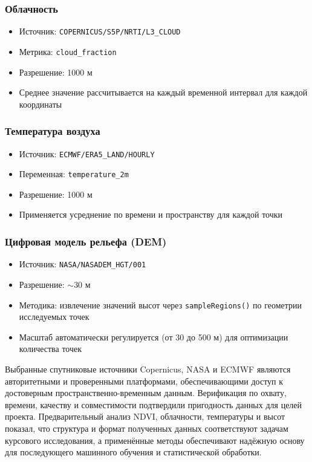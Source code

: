 \subsubsection*{Облачность}

\begin{itemize}
	\item Источник: \texttt{COPERNICUS/S5P/NRTI/L3\_CLOUD}
	\item Метрика: \texttt{cloud\_fraction}
	\item Разрешение: 1000 м
	\item Среднее значение рассчитывается на каждый временной интервал для каждой координаты
\end{itemize}

\subsubsection*{Температура воздуха}

\begin{itemize}
	\item Источник: \texttt{ECMWF/ERA5\_LAND/HOURLY}
	\item Переменная: \texttt{temperature\_2m}
	\item Разрешение: 1000 м
	\item Применяется усреднение по времени и пространству для каждой точки
\end{itemize}

\subsubsection*{Цифровая модель рельефа (DEM)}

\begin{itemize}
	\item Источник: \texttt{NASA/NASADEM\_HGT/001}
	\item Разрешение: $\sim$30 м
	\item Методика: извлечение значений высот через \texttt{sampleRegions()} по геометрии исследуемых точек
	\item Масштаб автоматически регулируется (от 30 до 500 м) для оптимизации количества точек
\end{itemize}

Выбранные спутниковые источники Copernicus, NASA и ECMWF являются авторитетными и проверенными платформами, обеспечивающими доступ к достоверным пространственно-временным данным. Верификация по охвату, времени, качеству и совместимости подтвердили пригодность данных для целей проекта. Предварительный анализ NDVI, облачности, температуры и высот показал, что структура и формат полученных данных соответствуют задачам курсового исследования, а применённые методы обеспечивают надёжную основу для последующего машинного обучения и статистической обработки.
